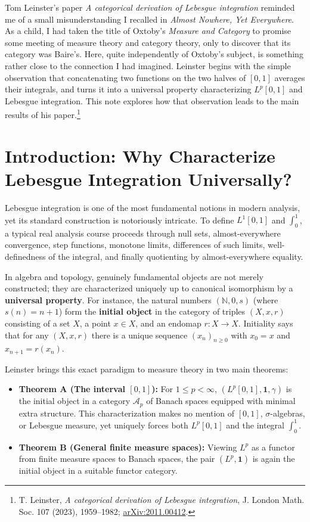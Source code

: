 
Tom Leinster's paper \emph{A categorical derivation of Lebesgue integration} reminded me of a small misunderstanding I recalled in \emph{Almost Nowhere, Yet Everywhere}. As a child, I had taken the title of Oxtoby's \emph{Measure and Category} to promise some meeting of measure theory and category theory, only to discover that its category was Baire's. Here, quite independently of Oxtoby's subject, is something rather close to the connection I had imagined. Leinster begins with the simple observation that concatenating two functions on the two halves of $[0,1]$ averages their integrals, and turns it into a universal property characterizing $L^p[0,1]$ and Lebesgue integration. This note explores how that observation leads to the main results of his paper.\footnote{T. Leinster, \emph{A categorical derivation of Lebesgue integration}, J. London Math. Soc. 107 (2023), 1959--1982; \href{https://arxiv.org/abs/2011.00412}{arXiv:2011.00412}.}

\section{Introduction: Why Characterize Lebesgue Integration Universally?}

Lebesgue integration is one of the most fundamental notions in modern analysis, yet its standard construction is notoriously intricate. To define $L^1[0,1]$ and $\int_0^1$, a typical real analysis course proceeds through null sets, almost-everywhere convergence, step functions, monotone limits, differences of such limits, well-definedness of the integral, and finally quotienting by almost-everywhere equality.

In algebra and topology, genuinely fundamental objects are not merely constructed; they are characterized uniquely up to canonical isomorphism by a \textbf{universal property}. For instance, the natural numbers $(\mathbb{N}, 0, s)$ (where $s(n) = n+1$) form the \textbf{initial object} in the category of triples $(X, x, r)$ consisting of a set $X$, a point $x \in X$, and an endomap $r : X \to X$. Initiality says that for any $(X, x, r)$ there is a unique sequence $(x_n)_{n \ge 0}$ with $x_0 = x$ and $x_{n+1} = r(x_n)$.

Leinster brings this exact paradigm to measure theory in two main theorems:
\begin{itemize}
    \item \textbf{Theorem A (The interval $[0,1]$):} For $1 \le p < \infty$, $(L^p[0,1], \mathbf{1}, \gamma)$ is the initial object in a category $\mathcal{A}_p$ of Banach spaces equipped with minimal extra structure. This characterization makes no mention of $[0,1]$, $\sigma$-algebras, or Lebesgue measure, yet uniquely forces both $L^p[0,1]$ and the integral $\int_0^1$.
    \item \textbf{Theorem B (General finite measure spaces):} Viewing $L^p$ as a functor from finite measure spaces to Banach spaces, the pair $(L^p, \mathbf{1})$ is again the initial object in a suitable functor category.
\end{itemize}

